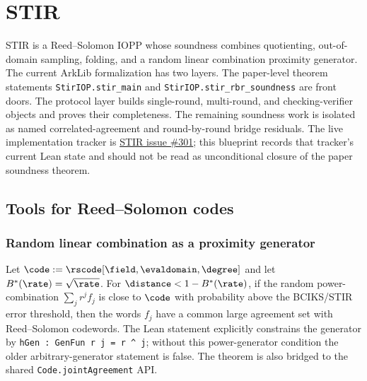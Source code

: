 
\section{STIR}\label{sec:stir}

STIR is a Reed--Solomon IOPP whose soundness combines quotienting, out-of-domain
sampling, folding, and a random linear combination proximity generator.  The current ArkLib
formalization has two layers.  The paper-level theorem statements
\texttt{StirIOP.stir\_main} and \texttt{StirIOP.stir\_rbr\_soundness} are front doors.  The
protocol layer builds single-round, multi-round, and checking-verifier objects and proves their
completeness.  The remaining soundness work is isolated as named correlated-agreement and
round-by-round bridge residuals.  The live implementation tracker is
\href{https://github.com/lalalune/ArkLib/issues/301}{STIR issue \#301}; this blueprint records
that tracker's current Lean state and should not be read as unconditional closure of the paper
soundness theorem.

\subsection{Tools for Reed--Solomon codes}\label{sec:stir_tools}

\subsubsection{Random linear combination as a proximity generator}\label{sec:proximity_gap}

\begin{theorem}\label{thm:proximity_gap}
    Let $\code := \rscode[\field,\evaldomain,\degree]$ and let
    $B^*(\rate)=\sqrt{\rate}$.  For $\distance < 1-B^*(\rate)$, if the random
    power-combination $\sum_j r^j f_j$ is close to $\code$ with probability above the
    BCIKS/STIR error threshold, then the words $f_j$ have a common large agreement set with
    Reed--Solomon codewords.  The Lean statement explicitly constrains the generator by
    \texttt{hGen : GenFun r j = r \^{} j}; without this power-generator condition the older
    arbitrary-generator statement is false.  The theorem is also bridged to the shared
    \texttt{Code.jointAgreement} API.
\end{theorem}

